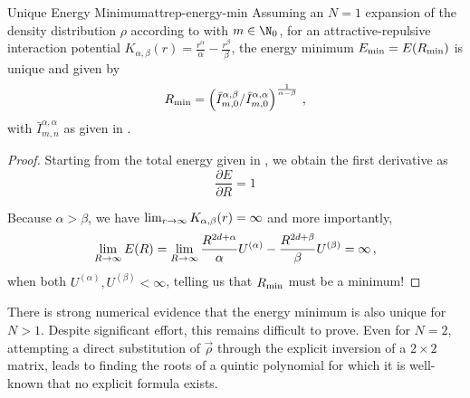 \begin{lemma}{Unique Energy Minimum}{attrep-energy-min}
  Assuming an $N=1$ expansion of the density distribution $\rho$ according to  with $m \in \N_0$, for an attractive-repulsive interaction potential $K_{\alpha, \beta}(r) = \frac{r^\alpha}{\alpha} - \frac{r^\beta}{\beta}$, the energy minimum $E_{\rm min} = E(R_{\rm min})$ is unique and given by
  $$R_{\rm min} = \left({\bar{I}_{m,0}^{\alpha,\beta} / \bar{I}_{m,0}^{\alpha,\alpha}}\right)^\frac{1}{\alpha-\beta}\,,$$
  with $\bar{I}_{m,n}^{\alpha,\alpha}$ as given in .
\end{lemma}
\begin{proof}
  Starting from the total energy given in , we obtain the first derivative as
  $$\frac{\partial E}{\partial R} = 1$$

  Because $\alpha > \beta$, we have $\lim_{r \rightarrow \infty} K_{\alpha,\beta}(r) = \infty$ and more importantly,
  $$\lim_{R \rightarrow \infty} E(R) = \lim_{R \rightarrow \infty} \frac{R^{2d+\alpha}}{\alpha} U^{(\alpha)} - \frac{R^{2d+\beta}}{\beta} U^{(\beta)} = \infty\,,$$
  when both $U^{(\alpha)}, U^{(\beta)} < \infty$, telling us that $R_{\rm min}$ must be a minimum!
\end{proof}

There is strong numerical evidence that the energy minimum is also unique for $N > 1$.
Despite significant effort, this remains difficult to prove.
Even for $N = 2$, attempting a direct substitution of $\vec{\rho}$ through the explicit inversion of a $2 \times 2$ matrix, leads to finding the roots of a quintic polynomial for which it is well-known that no explicit formula exists.
